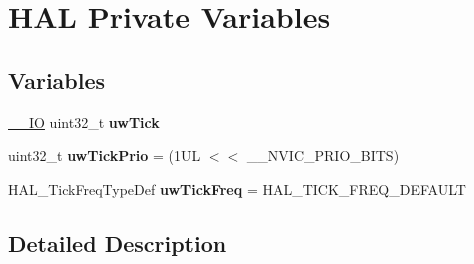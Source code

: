 \hypertarget{group___h_a_l___private___variables}{}\section{H\+AL Private Variables}
\label{group___h_a_l___private___variables}
\subsection*{Variables}
\begin{DoxyCompactItemize}
\item 
\mbox{\label{group___h_a_l___private___variables_ga9d411ea525781e633bf7ea7ef2f90728}} 
\hyperlink{core__sc300_8h_aec43007d9998a0a0e01faede4133d6be}{\+\_\+\+\_\+\+IO} uint32\+\_\+t {\bfseries uw\+Tick}
\item 
\mbox{\label{group___h_a_l___private___variables_ga3000c5e83924ed2debb1849c738d4be2}} 
uint32\+\_\+t {\bfseries uw\+Tick\+Prio} = (1\+U\+L $<$$<$ \+\_\+\+\_\+\+N\+V\+I\+C\+\_\+\+P\+R\+I\+O\+\_\+\+B\+I\+T\+S)
\item 
\mbox{\label{group___h_a_l___private___variables_ga84a0c55c4d0bff06a085b4fcfd6531cd}} 
H\+A\+L\+\_\+\+Tick\+Freq\+Type\+Def {\bfseries uw\+Tick\+Freq} = H\+A\+L\+\_\+\+T\+I\+C\+K\+\_\+\+F\+R\+E\+Q\+\_\+\+D\+E\+F\+A\+U\+LT
\end{DoxyCompactItemize}


\subsection{Detailed Description}
